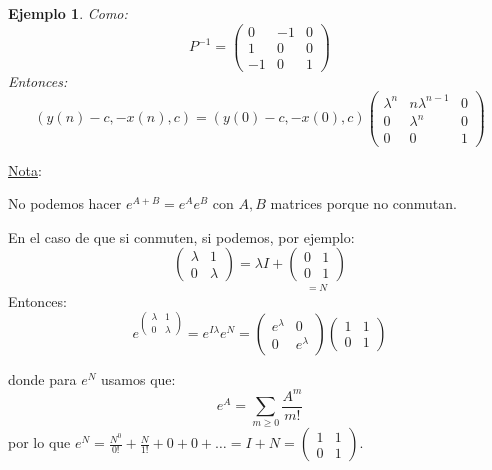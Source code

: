 \documentclass[11pt,a4paper]{article}
\theoremstyle{break}
\newtheorem{example}[theorem]{Ejemplo}
\begin{document}
\begin{example}
Como:
$$P^{-1} = \begin{pmatrix}
0 & -1 & 0 \\
1 & 0 & 0 \\
-1 & 0 & 1
\end{pmatrix}$$
Entonces:
$$(y(n)-c, -x(n), c) = (y(0)-c, -x(0), c) \begin{pmatrix}
\lambda^{n} & n\lambda^{n-1} & 0 \\
0 & \lambda^{n} & 0 \\
0 & 0 & 1
\end{pmatrix}$$
\end{example}

\underline{Nota}:

No podemos hacer $e^{A+B} = e^{A}e^{B}$ con $A, B$ matrices porque no conmutan.

En el caso de que si conmuten, si podemos, por ejemplo:
$$\begin{pmatrix}
\lambda & 1 \\
0 & \lambda
\end{pmatrix} = \lambda I + \underset{= N}{\begin{pmatrix}
0 & 1 \\
0 & 1
\end{pmatrix}}$$
Entonces:
$$e^{\begin{pmatrix}
\lambda & 1 \\
0 & \lambda
\end{pmatrix}} = e^{I\lambda}e^{N} = \begin{pmatrix}
e^{\lambda} & 0 \\
0 & e^{\lambda}
\end{pmatrix} \begin{pmatrix}
1 & 1 \\
0 & 1
\end{pmatrix}$$

donde para $e^{N}$ usamos que:
$$e^{A} = \sum_{m \geq 0} \frac{A^{m}}{m!}$$
por lo que $e^{N} = \frac{N^{0}}{0!} + \frac{N}{1!} + 0 + 0 + \dots = I + N = \begin{pmatrix}
1 & 1 \\
0 & 1
\end{pmatrix}$.
\end{document}
